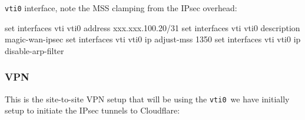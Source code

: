 \documentclass[
]{article}
\newenvironment{Shaded}{\begin{snugshade}}{\end{snugshade}}
\newcommand{\BuiltInTok}[1]{#1}
\newcommand{\NormalTok}[1]{#1}
\newcommand{\StringTok}[1]{\textcolor[rgb]{0.31,0.60,0.02}{#1}}
\begin{document}
\texttt{vti0} interface, note the MSS clamping from the IPsec overhead:

\begin{Shaded}
\begin{Highlighting}[numbers=left,,]
\BuiltInTok{set}\NormalTok{ interfaces vti vti0 address }\StringTok{\textquotesingle{}xxx.xxx.100.20/31\textquotesingle{}}
\BuiltInTok{set}\NormalTok{ interfaces vti vti0 description }\StringTok{\textquotesingle{}magic{-}wan{-}ipsec\textquotesingle{}}
\BuiltInTok{set}\NormalTok{ interfaces vti vti0 ip adjust{-}mss }\StringTok{\textquotesingle{}1350\textquotesingle{}}
\BuiltInTok{set}\NormalTok{ interfaces vti vti0 ip disable{-}arp{-}filter}
\end{Highlighting}
\end{Shaded}

\newpage{}

\subsubsection{VPN}\label{vpn}

This is the site-to-site VPN setup that will be using the
\texttt{vti0}~we have initially setup to initiate the IPsec tunnels to
Cloudflare:
\end{document}
